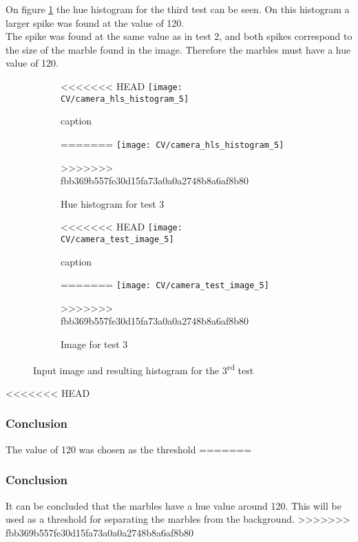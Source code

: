 \documentclass[../Head/Main.tex]{subfiles}
\begin{document}
On figure \ref{fig:hist_test_3} the hue histogram for the third test can be seen. On this histogram a larger spike was found at the value of 120.\\
The spike was found at the same value as in test 2, and both spikes correspond to the size of the marble found in the image. Therefore the marbles must have a hue value of 120.
\begin{figure}[H]
	\centering
	\begin{subfigure}[b]{0.48\textwidth}
		\centering
<<<<<<< HEAD
		\texttt{[image: CV/camera\_hls\_histogram\_5]}
		\caption{caption}
=======
		\texttt{[image: CV/camera\_hls\_histogram\_5]}
		\caption{Hue histogram for test 3}
		\label{fig:hist_test_3}
>>>>>>> fbb369b557fe30d15fa73a0a0a2748b8a6af8b80
	\end{subfigure}
	\hfill
	\begin{subfigure}[b]{0.5\textwidth}
		\centering
<<<<<<< HEAD
		\texttt{[image: CV/camera\_test\_image\_5]}
		\caption{caption}
=======
		\texttt{[image: CV/camera\_test\_image\_5]}
		\caption{Image for test 3}
		\label{fig:image_test_3}
>>>>>>> fbb369b557fe30d15fa73a0a0a2748b8a6af8b80
	\end{subfigure}
	\caption{Input image and resulting histogram for the 3\textsuperscript{rd} test}
	\label{fig:test_3}
\end{figure}

<<<<<<< HEAD
\subsubsection*{Conclusion}
The value of 120 was chosen as the threshold 
=======
\subsubsection{Conclusion}
It can be concluded that the marbles have a hue value around 120. This will be used as a threshold for separating the marbles from the background.
>>>>>>> fbb369b557fe30d15fa73a0a0a2748b8a6af8b80
\end{document}
